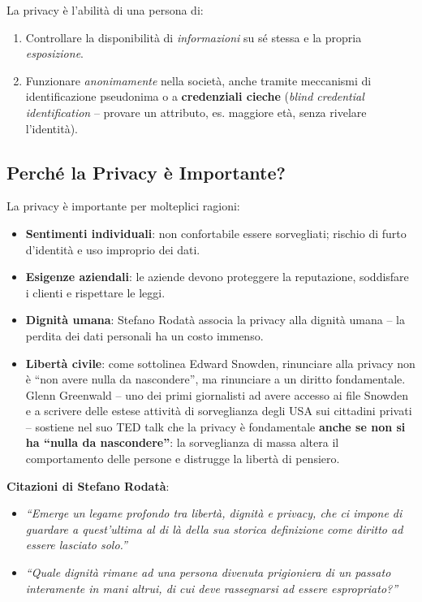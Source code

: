 \documentclass[a4paper,11pt]{article}
\begin{document}
\begin{definizione}
La privacy \`{e} l'abilit\`{a} di una persona di:
\begin{enumerate}
  \item Controllare la disponibilit\`{a} di \emph{informazioni} su s\'{e} stessa e la propria \emph{esposizione}.
  \item Funzionare \emph{anonimamente} nella societ\`{a}, anche tramite meccanismi di identificazione pseudonima o a \textbf{credenziali cieche} (\emph{blind credential identification} -- provare un attributo, es. maggiore et\`{a}, senza rivelare l'identit\`{a}).
\end{enumerate}
\end{definizione}

\subsection{Perch\'{e} la Privacy \`{e} Importante?}

La privacy \`{e} importante per molteplici ragioni:
\begin{itemize}
  \item \textbf{Sentimenti individuali}: non confortabile essere sorvegliati; rischio di furto d'identit\`{a} e uso improprio dei dati.
  \item \textbf{Esigenze aziendali}: le aziende devono proteggere la reputazione, soddisfare i clienti e rispettare le leggi.
  \item \textbf{Dignit\`{a} umana}: Stefano Rodat\`{a} associa la privacy alla dignit\`{a} umana -- la perdita dei dati personali ha un costo immenso.
  \item \textbf{Libert\`{a} civile}: come sottolinea Edward Snowden, rinunciare alla privacy non \`{e} ``non avere nulla da nascondere'', ma rinunciare a un diritto fondamentale. Glenn Greenwald -- uno dei primi giornalisti ad avere accesso ai file Snowden e a scrivere delle estese attivit\`{a} di sorveglianza degli USA sui cittadini privati -- sostiene nel suo TED talk che la privacy \`{e} fondamentale \textbf{anche se non si ha ``nulla da nascondere''}: la sorveglianza di massa altera il comportamento delle persone e distrugge la libert\`{a} di pensiero.
\end{itemize}

\textbf{Citazioni di Stefano Rodat\`{a}}:
\begin{itemize}
  \item \emph{``Emerge un legame profondo tra libert\`{a}, dignit\`{a} e privacy, che ci impone di guardare a quest'ultima al di l\`{a} della sua storica definizione come diritto ad essere lasciato solo.''}
  \item \emph{``Quale dignit\`{a} rimane ad una persona divenuta prigioniera di un passato interamente in mani altrui, di cui deve rassegnarsi ad essere espropriato?''}
\end{itemize}
\end{document}
